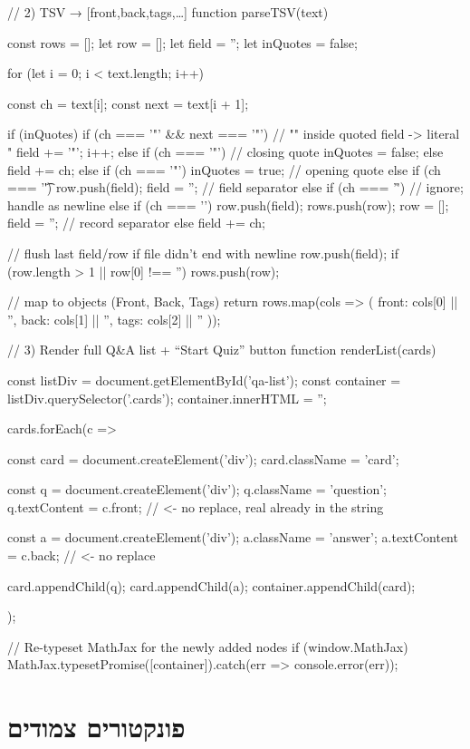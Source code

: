 \documentclass{tstextbook}
\begin{document}
    // 2) TSV → [{front,back,tags},…]
    function parseTSV(text) {
  const rows = [];
  let row = [];
  let field = '';
  let inQuotes = false;

  for (let i = 0; i < text.length; i++) {
    const ch = text[i];
    const next = text[i + 1];

    if (inQuotes) {
      if (ch === '"' && next === '"') {
        // "" inside quoted field -> literal "
        field += '"';
        i++;
      } else if (ch === '"') {
        // closing quote
        inQuotes = false;
      } else {
        field += ch;
      }
    } else {
      if (ch === '"') {
        inQuotes = true;                // opening quote
      } else if (ch === '\t') {
        row.push(field); field = '';    // field separator
      } else if (ch === '\r') {
        // ignore; handle \n as newline
      } else if (ch === '\n') {
        row.push(field); rows.push(row);
        row = []; field = '';           // record separator
      } else {
        field += ch;
      }
    }
  }
  // flush last field/row if file didn't end with newline
  row.push(field);
  if (row.length > 1 || row[0] !== '') rows.push(row);

  // map to objects (Front, Back, Tags)
  return rows.map(cols => ({
    front: cols[0] || '',
    back:  cols[1] || '',
    tags:  cols[2] || ''
  }));
}
// 3) Render full Q&A list + “Start Quiz” button
function renderList(cards) {
  const listDiv = document.getElementById('qa-list');
  const container = listDiv.querySelector('.cards');
  container.innerHTML = '';

  cards.forEach(c => {
    const card = document.createElement('div');
    card.className = 'card';

    const q = document.createElement('div');
    q.className = 'question';
    q.textContent = c.front;   // <- no replace, real \n already in the string

    const a = document.createElement('div');
    a.className = 'answer';
    a.textContent = c.back;    // <- no replace

    card.appendChild(q);
    card.appendChild(a);
    container.appendChild(card);
  });

  // Re-typeset MathJax for the newly added nodes
  if (window.MathJax) {
    MathJax.typesetPromise([container]).catch(err => console.error(err));
  }
}
  \chapter{פונקטורים צמודים}
\end{document}
